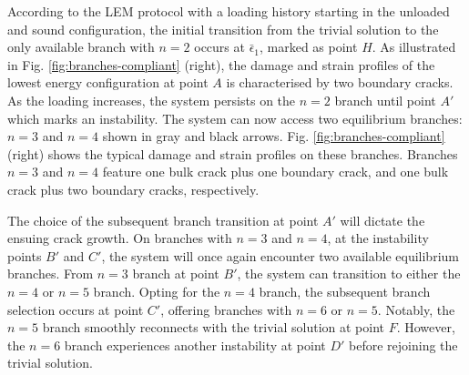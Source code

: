 According to the LEM protocol with a loading history starting in the unloaded and sound configuration, the initial transition from the trivial solution to the only available branch with $n=2$ occurs at $\bar \epsilon_1$, marked as point $H$. As illustrated in Fig. \ref{fig:branches-compliant} (right), the damage and strain profiles of the lowest energy configuration at point $A$ is characterised by two boundary cracks. As the loading increases, the system persists on the $n=2$ branch until point $A'$ which marks an instability. The system can now access two equilibrium branches: $n=3$ and $n=4$ shown in gray and black arrows. Fig. \ref{fig:branches-compliant} (right) shows the typical damage and strain profiles on these branches. Branches $n=3$ and $n=4$ feature one bulk crack plus one boundary crack, and one bulk crack plus two boundary cracks, respectively.

The choice of the subsequent branch transition at point $A'$ will dictate the ensuing crack growth. On branches with $n=3$ and $n=4$, at the instability points $B'$ and $C'$, the system will once again encounter two available equilibrium branches. From $n=3$ branch  at point $B'$, the system can transition to either the $n=4$ or $n=5$ branch. Opting for the $n=4$ branch, the subsequent branch selection occurs at point $C'$, offering branches with $n=6$ or $n=5$. Notably, the $n=5$ branch smoothly reconnects with the trivial solution at point $F$. However, the $n=6$ branch experiences another instability at point $D'$ before rejoining the trivial solution.



